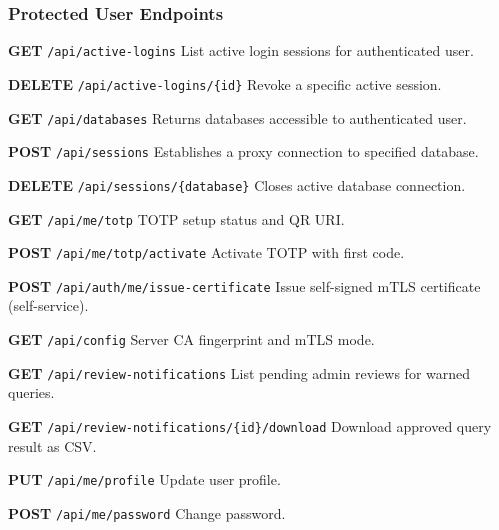 \subsubsection{Protected User Endpoints}

\begin{tcolorbox}[colback=green!5, colframe=green!40, title=\textbf{User Session and Self-Service}]

\textbf{GET} \texttt{/api/active-logins} \quad List active login sessions for authenticated user.

\vspace{0.2cm}

\textbf{DELETE} \texttt{/api/active-logins/\{id\}} \quad Revoke a specific active session.

\vspace{0.2cm}

\textbf{GET} \texttt{/api/databases} \quad Returns databases accessible to authenticated user.

\vspace{0.2cm}

\textbf{POST} \texttt{/api/sessions} \quad Establishes a proxy connection to specified database.

\vspace{0.2cm}

\textbf{DELETE} \texttt{/api/sessions/\{database\}} \quad Closes active database connection.

\vspace{0.2cm}

\textbf{GET} \texttt{/api/me/totp} \quad TOTP setup status and QR URI.

\vspace{0.2cm}

\textbf{POST} \texttt{/api/me/totp/activate} \quad Activate TOTP with first code.

\vspace{0.2cm}

\textbf{POST} \texttt{/api/auth/me/issue-certificate} \quad Issue self-signed mTLS certificate (self-service).

\vspace{0.2cm}

\textbf{GET} \texttt{/api/config} \quad Server CA fingerprint and mTLS mode.

\vspace{0.2cm}

\textbf{GET} \texttt{/api/review-notifications} \quad List pending admin reviews for warned queries.

\vspace{0.2cm}

\textbf{GET} \texttt{/api/review-notifications/\{id\}/download} \quad Download approved query result as CSV.

\vspace{0.2cm}

\textbf{PUT} \texttt{/api/me/profile} \quad Update user profile.

\vspace{0.2cm}

\textbf{POST} \texttt{/api/me/password} \quad Change password.

\end{tcolorbox}

